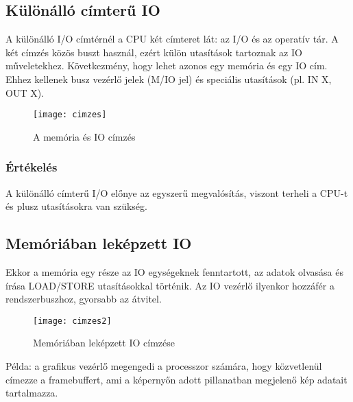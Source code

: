\subsection{Különálló címterű IO}
A különálló I/O címtérnél a CPU két címteret lát: az I/O és az operatív tár.
A két címzés közös buszt használ, ezért külön utasítások tartoznak az IO műveletekhez.
Következmény, hogy lehet azonos egy memória és egy IO cím.
Ehhez kellenek busz vezérlő jelek (M/IO jel) és speciális utasítások (pl. IN X, OUT X).
\begin{figure}[H]
    \texttt{[image: cimzes]}
    \centering
    \caption{A memória és IO címzés}
    \label{fig:cimzes}
\end{figure}
\subsubsection{Értékelés}
A különálló címterű I/O előnye az egyszerű megvalósítás, viszont terheli a CPU-t és plusz utasításokra van szükség.

\subsection{Memóriában leképzett IO}
Ekkor a memória egy része az IO egységeknek fenntartott, az adatok olvasása és írása LOAD/STORE utasításokkal történik.
Az IO vezérlő ilyenkor hozzáfér a rendszerbuszhoz, gyorsabb az átvitel.
\begin{figure}[H]
    \texttt{[image: cimzes2]}
    \centering
    \caption{Memóriában leképzett IO címzése}
    \label{fig:cimzes2}
\end{figure}
Példa: a grafikus vezérlő megengedi a processzor számára, hogy közvetlenül címezze a framebuffert, ami a képernyőn adott pillanatban megjelenő kép adatait tartalmazza.


